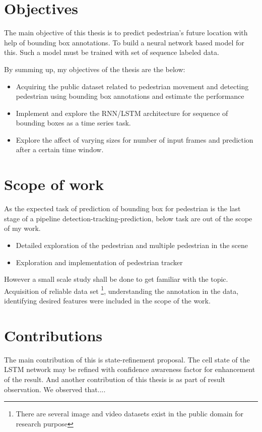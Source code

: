 \section{Objectives}
\newpara The main objective of this thesis is to predict pedestrian's future location with help of bounding box annotations. To build a neural network based model for this. Such a model must be trained with set of sequence labeled data.

By summing up, my objectives of the thesis are the below:
\begin{itemize}
	\item  Acquiring the public dataset related to pedestrian movement and detecting pedestrian using bounding box annotations and estimate the performance

	\item Implement and explore the RNN/LSTM architecture for sequence of bounding boxes as a time series task.
	\item Explore the affect of varying sizes for number of input frames and prediction after a certain time window.
\end{itemize}

\section{Scope of work}
As the expected task of prediction of bounding box for pedestrian is the last stage of a pipeline detection-tracking-prediction, below task are out of the scope of my work.
\begin{itemize}
	\item Detailed exploration of the pedestrian and multiple pedestrian in the scene
	\item Exploration and implementation of pedestrian tracker
\end{itemize}
However a small scale study shall be done to get familiar with the topic.  Acquisition of reliable data set \footnote{There are several image and video datasets exist in the public domain for research purpose}, understanding the annotation in the data, identifying desired features were included in the scope of the work.

\section{Contributions}
The main contribution of this is state-refinement proposal. The cell state of the LSTM network may be refined with confidence awareness factor for enhancement of the result. And another contribution of this thesis is as part of result observation. We observed that....

